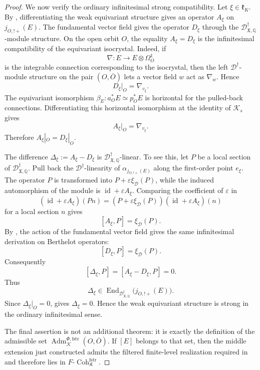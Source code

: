\documentclass[10pt,a4paper]{amsart}
\newcommand{\Adm}{\operatorname{Adm}}
\newcommand{\Coh}{\operatorname{Coh}}
\newcommand{\fstr}{\mathrm{fstr}}
\begin{document}
\begin{proof}
We now verify the ordinary infinitesimal strong compatibility. Let
\(\xi\in\mathfrak k_K\). By
, differentiating the weak
equivariant structure gives an operator \(A_\xi\) on \(j_{O,!+}(E)\). The
fundamental vector field gives the operator \(D_\xi\) through the
\(\mathscr D^\dagger_{\mathfrak X,\mathbb Q}\)-module structure. On the open
orbit \(O\), the equality \(A_\xi=D_\xi\) is the infinitesimal compatibility of
the equivariant isocrystal. Indeed, if
\[
  \nabla:E\longrightarrow E\otimes\Omega^1_O
\]
is the integrable connection corresponding to the isocrystal, then the
left \(\mathscr D^\dagger\)-module structure on the pair \((O,\overline O)\)
lets a vector field \(w\) act as \(\nabla_w\). Hence
\[
  D_\xi|_O=\nabla_{v_\xi}.
\]
The equivariant isomorphism \(\beta_E:a_O^*E\simeq p_O^*E\) is horizontal for
the pulled-back connections. Differentiating this horizontal isomorphism at the
identity of \(\mathcal K_s\) gives
\[
  A_\xi|_O=\nabla_{v_\xi}.
\]
Therefore \(A_\xi|_O=D_\xi|_O\).

The difference \(\Delta_\xi:=A_\xi-D_\xi\) is
\(\mathscr D^\dagger_{\mathfrak X,\mathbb Q}\)-linear. To see this, let
\(P\) be a local section of \(\mathscr D^\dagger_{\mathfrak X,\mathbb Q}\). Pull
back the \(\mathscr D^\dagger\)-linearity of \(\alpha_{j_{O,!+}(E)}\) along the
first-order point \(e_\xi\). The operator \(P\) is transformed into
\(P+\varepsilon\xi_{\mathscr D}(P)\), while the induced automorphism of the
module is \(\operatorname{id}+\varepsilon A_\xi\). Comparing the coefficient of
\(\varepsilon\) in
\[
  (\operatorname{id}+\varepsilon A_\xi)(P n)
  =(P+\varepsilon\xi_{\mathscr D}(P))
  (\operatorname{id}+\varepsilon A_\xi)(n)
\]
for a local section \(n\) gives
\[
  [A_\xi,P]=\xi_{\mathscr D}(P).
\]
By , the action of the
fundamental vector field gives the same infinitesimal derivation on Berthelot
operators:
\[
  [D_\xi,P]=\xi_{\mathscr D}(P).
\]
Consequently
\begin{equation}
\label{eq:strong-middle-extension-commutator}
  [\Delta_\xi,P]
  =[A_\xi-D_\xi,P]
  =0.
\end{equation}
Thus
\[
  \Delta_\xi\in
  \operatorname{End}_{\mathscr D^\dagger_{\mathfrak X,\mathbb Q}}
  \bigl(j_{O,!+}(E)\bigr).
\]
Since \(\Delta_\xi|_O=0\), 
gives \(\Delta_\xi=0\). Hence the weak equivariant structure is strong in the
ordinary infinitesimal sense.

The final assertion is not an additional theorem: it is exactly the definition
of the admissible set \(\Adm^{\Phi,\fstr}_{\mathcal K}(O,\overline O)\). If
\([E]\) belongs to that set, then the middle extension just constructed admits
the filtered finite-level realization required in
 and therefore lies in
\(F\text{-}\Coh^{\fstr}_{\mathfrak K}\).
\end{proof}
\end{document}
